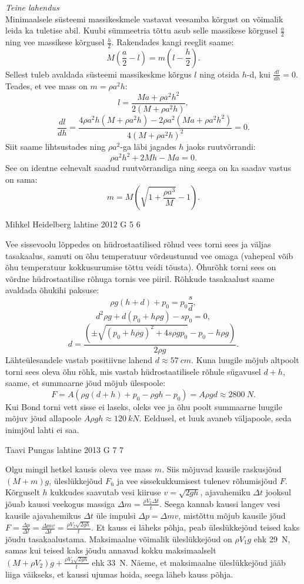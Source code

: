 \documentclass[11pt, twoside]{article}
\begin{document}
{{\emph{Teine lahendus}\\
Minimaalsele süsteemi massikeskmele vastavat veesamba kõrgust on võimalik leida ka tuletise abil. Kuubi sümmeetria tõttu asub selle massikese kõrgusel $\frac{a}{2}$ ning vee massikese kõrgusel $\frac{h}{2}$. Rakendades kangi reeglit saame: 
$$M(\frac{a}{2}-l)=m(l-\frac{h}{2}).$$ 
Sellest tuleb avaldada süsteemi massikeskme kõrgus $l$ ning otsida $h$-d, kui $\frac{dl}{dh}=0$. Teades, et vee mass on $m=\rho a^2h$:
$$l=\frac{Ma+\rho a^2h^2}{2(M+\rho a^2h)},$$ 
$$\frac{dl}{dh}=\frac{4\rho a^2h(M+\rho a^2h)-2\rho a^2(Ma+\rho a^2h^2)}{4(M+\rho a^2h)^2}=0.$$ 
Siit saame lihtsustades ning $\rho a^2$-ga läbi jagades $h$ jaoks ruutvõrrandi:
$$\rho a^2h^2+2Mh-Ma=0.$$ 
See on identne eelnevalt saadud ruutvõrrandiga ning seega on ka saadav vastus on sama:
$$m=M(\sqrt{1+\frac{\rho a^3}{M}}-1).$$
\fi
}

{Mihkel Heidelberg} %
{lahtine} %
{2012} %
{G 5} %
{6} %
{

\ifSolution
Vee sissevoolu lõppedes on hüdrostaatilised rõhud vees torni sees ja väljas tasakaalus, samuti on õhu temperatuur võrdsustunud vee omaga (vahepeal võib õhu temperatuur kokkusurumise tõttu veidi tõusta). Õhurõhk torni sees on võrdne hüdrostaatilise rõhuga tornis vee piiril. Rõhkude tasakaalust saame avaldada õhukihi paksuse:
$$ \rho g (h+d) + p_0 = p_0 \frac{s}{d},$$
$$ d^2 \rho g  + d (p_0 + h \rho g) - s p_0=0, $$
$$ d = \frac{( \pm \sqrt{(p_0 + h \rho g)^2 + 4 s \rho g p_0 } - p_0 - h \rho g)}{2\rho g }.$$
Lähteülesandele vastab positiivne lahend $d \approx \SI{57}{cm}$.
Kuna luugile mõjub altpoolt torni sees oleva õhu rõhk, mis vastab hüdrostaatilisele rõhule sügavusel $d+h$, saame, et summaarne jõud mõjub ülespoole:
$$F = A(\rho g (d+h) + p_0 - \rho g h - p_0) = A \rho g d \approx \SI{2800}{N}.  $$ 
Kui Bond torni vett sisse ei laseks, oleks vee ja õhu poolt summaarne luugile mõjuv jõud allapoole $A \rho g h \approx \SI{120}{kN}$. Eeldusel, et luuk avaneb väljapoole, seda inimjõul lahti ei saa.
\fi
}

{Taavi Pungas} %
{lahtine} %
{2013} %
{G 7} %
{7} %
{

\ifSolution
Olgu mingil hetkel kausis oleva vee mass $m$. Siis mõjuvad kausile raskusjõud $(M+m)g$, üleslükkejõud $F_{ü}$ ja vee sissekukkumisest tulenev rõhumisjõud $F$. Kõrguselt $h$ kukkudes saavutab vesi kiiruse $v=\sqrt{2gh}$, ajavahemiku $\Delta t$ jooksul jõuab kaussi veekogus massiga $\Delta m = \frac{\rho V_2 \Delta t}{t}$. Seega kannab kaussi langev vesi kausile ajavahemikus $\Delta t$ üle impulsi $\Delta p =\Delta m v$, mistõttu mõjub kausile jõud $F=\frac{\Delta p}{\Delta t}=\frac{\Delta m v}{\Delta t}=\frac{\rho V_2 \sqrt{2gh}}{t}$. Et kauss ei läheks põhja, peab üleslükkejõud teised kaks jõudu tasakaalustama. Maksimaalne võimalik üleslükkejõud on $\rho V_1 g$ ehk \SI{29}{N}, samas kui teised kaks jõudu annavad kokku maksimaalselt $(M+\rho V_2)g + \frac{\rho V_2 \sqrt{2gh}}{t}$ ehk \SI{33}{N}. Näeme, et maksimaalne üleslükkejõud jääb liiga väikseks, et kaussi ujumas hoida, seega läheb kauss põhja.
\fi
}

}
\end{document}

